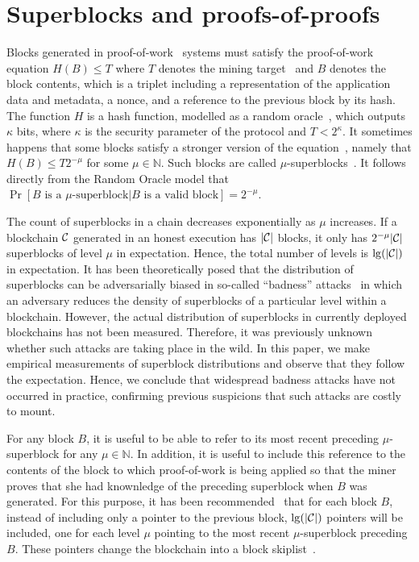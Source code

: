 \section{Superblocks and proofs-of-proofs}

Blocks generated in proof-of-work~\cite{C:DwoNao92} systems must satisfy the
proof-of-work equation $H(B) \leq T$ where $T$ denotes the mining
target~\cite{SP:BMCNKF15} and $B$ denotes the block contents, which is a triplet
including a representation of the application data and metadata, a nonce, and a
reference to the previous block by its hash. The function $H$ is a hash
function, modelled as a random oracle~\cite{CCS:BelRog93}, which outputs
$\kappa$ bits, where $\kappa$ is the security parameter of the protocol and $T <
2^\kappa$. It sometimes happens that some blocks satisfy a stronger version of
the equation~\cite{popow}, namely that $H(B) \leq T2^{-\mu}$ for some $\mu \in
\mathbb{N}$. Such blocks are called $\mu$-superblocks~\cite{nipopows}.
It follows directly from the Random Oracle model that
$\Pr[B \text{ is a } \mu\text{-superblock}|B \text{ is a valid block}] = 2^{-\mu}$.

The count of superblocks in a chain decreases exponentially as $\mu$ increases.
If a blockchain $\mathcal{C}$ generated in an honest execution has $|\mathcal{C}|$ blocks,
it only has $2^{-\mu}|\mathcal{C}|$ superblocks of level $\mu$ in expectation. Hence,
the total number of levels is $\lg(|\mathcal{C}|)$ in expectation. It has been
theoretically posed that the distribution of superblocks can be adversarially
biased in so-called ``badness'' attacks~\cite{nipopows} in which an adversary
reduces the density of superblocks of a particular level within a blockchain.
However, the actual distribution of superblocks in currently deployed
blockchains has not been measured. Therefore, it was previously unknown whether
such attacks are taking place in the wild. In this paper, we make empirical
measurements of superblock distributions and observe that they follow the
expectation. Hence, we conclude that widespread badness attacks have not
occurred in practice, confirming previous suspicions that such attacks are
costly to mount.

For any block $B$,
it is useful to be able to refer to its most recent preceding $\mu$-superblock
for any $\mu \in \mathbb{N}$. In addition, it is useful to include this
reference to the contents of the block to which proof-of-work is being applied
so that the miner proves that she had knownledge of the preceding superblock
when $B$ was generated. For this purpose, it has been
recommended~\cite{nipopows} that for each block $B$, instead of including only a
pointer to the previous block, $\lg(|\mathcal{C}|)$ pointers will be included, one
for each level $\mu$ pointing to the most recent $\mu$-superblock preceding $B$.
These pointers change the blockchain into a block
skiplist~\cite{skiplist,papadakis1993skip}.

